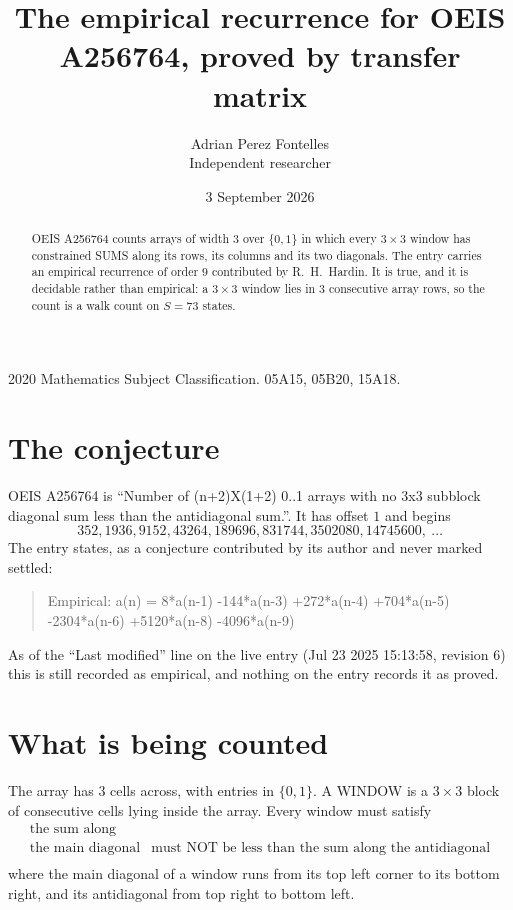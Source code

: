 \documentclass[11pt,a4paper]{article}
\title{The empirical recurrence for OEIS A256764, proved by transfer matrix}
\author{Adrian Perez Fontelles\\ \small Independent researcher}
\date{3 September 2026}
\theoremstyle{plain}
\theoremstyle{definition}
\begin{document}
\maketitle

\begin{abstract}
OEIS A256764 counts arrays of width $3$ over $\{0,1\}$ in which every $3\times3$ window has
constrained SUMS along its rows, its columns and its two diagonals. The entry carries an
empirical recurrence of order $9$ contributed by R.~H.~Hardin. It is true, and it is
decidable rather than empirical: a $3\times3$ window lies in $3$ consecutive array rows,
so the count is a walk count on $S=73$ states.
\end{abstract}

\noindent\small 2020 Mathematics Subject Classification. 05A15, 05B20, 15A18.\normalsize

\section{The conjecture}

OEIS A256764 is ``Number of (n+2)X(1+2) 0..1 arrays with no 3x3 subblock diagonal sum less than the antidiagonal sum.''. It has offset $1$ and begins
\[
352, 1936, 9152, 43264, 189696, 831744, 3502080, 14745600,\ \dots
\]
The entry states, as a conjecture contributed by its author and never marked settled:
\begin{quote}
Empirical: a(n) = 8*a(n-1) -144*a(n-3) +272*a(n-4) +704*a(n-5) -2304*a(n-6) +5120*a(n-8) -4096*a(n-9)
\end{quote}
As of the ``Last modified'' line on the live entry (Jul 23 2025 15:13:58, revision 6) this is still
recorded as empirical, and nothing on the entry records it as proved.

\section{What is being counted}

The array has $3$ cells across, with entries in $\{0,1\}$. A WINDOW is a $3\times3$ block
of consecutive cells lying inside the array. Every window must satisfy
\[
\begin{array}{ll}
\text{the sum along} & \text{} \\[2pt]
\text{the main diagonal} & \text{must NOT be less than the sum along the antidiagonal} \\
\end{array}
\]
where the main diagonal of a window runs from its top left corner to its bottom right, and its
antidiagonal from top right to bottom left.
\end{document}

